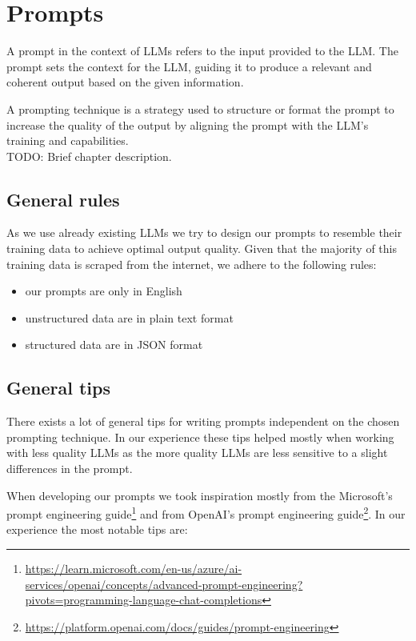 \chapter{Prompts}

A prompt in the context of LLMs refers to the input provided to the LLM. The prompt sets the context for the LLM, guiding it to produce a relevant and coherent output based on the given information.

A prompting technique is a strategy used to structure or format the prompt to increase the quality of the output by aligning the prompt with the LLM's training and capabilities. \\
 
TODO: Brief chapter description.

\section{General rules}
As we use already existing LLMs we try to design our prompts to resemble their training data to achieve optimal output quality. Given that the majority of this training data is scraped from the internet, we adhere to the following rules:
\begin{itemize}
\item our prompts are only in English
\item unstructured data are in plain text format
\item structured data are in JSON format
\end{itemize}


\section{General tips}
There exists a lot of general tips for writing prompts independent on the chosen prompting technique. In our experience these tips helped mostly when working with less quality LLMs as the more quality LLMs are less sensitive to a slight differences in the prompt.

When developing our prompts we took inspiration mostly from the Microsoft's prompt engineering guide\footnote{\url{https://learn.microsoft.com/en-us/azure/ai-services/openai/concepts/advanced-prompt-engineering?pivots=programming-language-chat-completions}} and from OpenAI's prompt engineering guide\footnote{\url{https://platform.openai.com/docs/guides/prompt-engineering}}. In our experience the most notable tips are:



